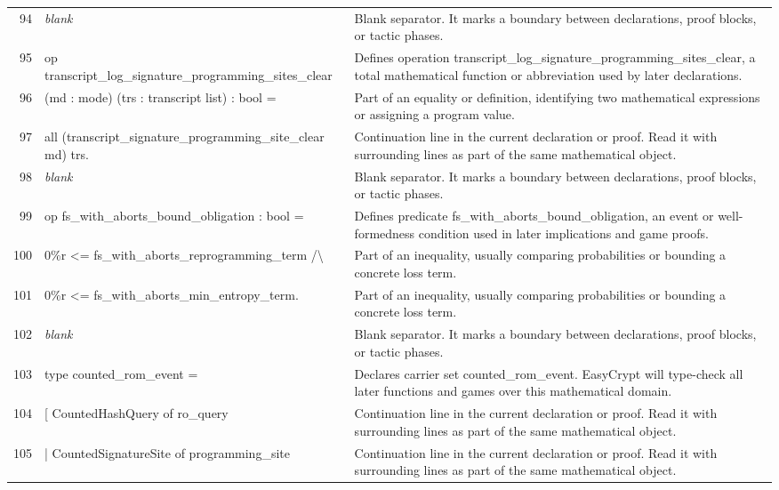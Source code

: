 \documentclass[10pt]{article}
\begin{document}
\begin{longtable}{r L{0.53\textwidth} L{0.37\textwidth}}
94 & {\ttfamily\scriptsize \emph{blank}} & Blank separator.  It marks a boundary between declarations, proof blocks, or tactic phases. \\
95 & {\ttfamily\scriptsize op transcript\_log\_signature\_programming\_sites\_clear} & Defines operation transcript\_log\_signature\_programming\_sites\_clear, a total mathematical function or abbreviation used by later declarations. \\
96 & {\ttfamily\scriptsize    (md : mode) (trs : transcript list) : bool =} & Part of an equality or definition, identifying two mathematical expressions or assigning a program value. \\
97 & {\ttfamily\scriptsize   all (transcript\_signature\_programming\_site\_clear md) trs.} & Continuation line in the current declaration or proof.  Read it with surrounding lines as part of the same mathematical object. \\
98 & {\ttfamily\scriptsize \emph{blank}} & Blank separator.  It marks a boundary between declarations, proof blocks, or tactic phases. \\
99 & {\ttfamily\scriptsize op fs\_with\_aborts\_bound\_obligation : bool =} & Defines predicate fs\_with\_aborts\_bound\_obligation, an event or well-formedness condition used in later implications and game proofs. \\
100 & {\ttfamily\scriptsize   0\%r <= fs\_with\_aborts\_reprogramming\_term /\textbackslash{}} & Part of an inequality, usually comparing probabilities or bounding a concrete loss term. \\
101 & {\ttfamily\scriptsize   0\%r <= fs\_with\_aborts\_min\_entropy\_term.} & Part of an inequality, usually comparing probabilities or bounding a concrete loss term. \\
102 & {\ttfamily\scriptsize \emph{blank}} & Blank separator.  It marks a boundary between declarations, proof blocks, or tactic phases. \\
103 & {\ttfamily\scriptsize type counted\_rom\_event =} & Declares carrier set counted\_rom\_event.  EasyCrypt will type-check all later functions and games over this mathematical domain. \\
104 & {\ttfamily\scriptsize   [ CountedHashQuery of ro\_query} & Continuation line in the current declaration or proof.  Read it with surrounding lines as part of the same mathematical object. \\
105 & {\ttfamily\scriptsize   | CountedSignatureSite of programming\_site} & Continuation line in the current declaration or proof.  Read it with surrounding lines as part of the same mathematical object. \\

\end{longtable}
\end{document}
